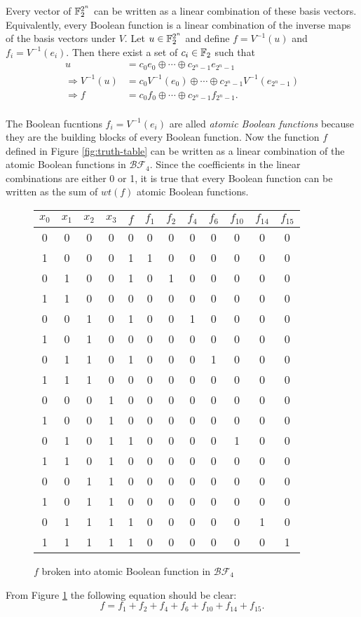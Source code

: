 \par Every vector of $\mathbb{F}_2^{2^n}$ can be written as a linear combination of these
basis vectors. Equivalently, every Boolean function is a linear combination of the
inverse maps of the basis vectors under $V$. Let $u\in\mathbb{F}_2^{2^n}$ and define
$f=V^{-1}(u)$ and $f_i=V^{-1}(e_i)$. Then there exist a set of $c_i\in\mathbb{F}_2$ such that
\begin{align*}
						  u        &=c_0e_0\oplus\cdots\oplus c_{2^n-1}e_{2^n-1} \\
	\Rightarrow V^{-1}(u)&=c_0V^{-1}(e_0)\oplus\cdots\oplus c_{2^n-1}V^{-1}(e_{2^n-1}) \\
	\Rightarrow f        &=c_0f_0\oplus\cdots\oplus c_{2^n-1}f_{2^n-1}.\\
\end{align*}

\par The Boolean fucntions $f_i=V^{-1}(e_i)$ are alled {\em atomic Boolean functions}
because they are the building blocks of every Boolean function. Now the function
$f$ defined in Figure \ref{fig:truth-table} can be written as a linear combination
of the atomic Boolean functions in $\mathcal{BF}_4$. Since the coefficients in the
linear combinations are either 0 or 1, it is true that every Boolean function can be
written as the sum of $wt(f)$ atomic Boolean functions.
\begin{figure}[h!]\label{fig:atomic-f}
	\centering
  \begin{tabular}{|c|c|c|c|c|c|c|c|c|c|c|c|}
    \hline
    $x_0$&$x_1$&$x_2$&$x_3$&$f$&$f_1$&$f_2$&$f_4$&$f_6$&$f_{10}$&$f_{14}$&$f_{15}$\\
    \hline
    0&0&0&0&0&0&0&0&0&0&0&0\\
    1&0&0&0&1&1&0&0&0&0&0&0\\
    0&1&0&0&1&0&1&0&0&0&0&0\\
    1&1&0&0&0&0&0&0&0&0&0&0\\
    0&0&1&0&1&0&0&1&0&0&0&0\\
    1&0&1&0&0&0&0&0&0&0&0&0\\
    0&1&1&0&1&0&0&0&1&0&0&0\\
    1&1&1&0&0&0&0&0&0&0&0&0\\
    0&0&0&1&0&0&0&0&0&0&0&0\\
    1&0&0&1&0&0&0&0&0&0&0&0\\
    0&1&0&1&1&0&0&0&0&1&0&0\\
    1&1&0&1&0&0&0&0&0&0&0&0\\
    0&0&1&1&0&0&0&0&0&0&0&0\\
    1&0&1&1&0&0&0&0&0&0&0&0\\
    0&1&1&1&1&0&0&0&0&0&1&0\\
    1&1&1&1&1&0&0&0&0&0&0&1\\
  	\hline
	\end{tabular}
	\caption{$f$ broken into atomic Boolean function in $\mathcal{BF}_4$}
\end{figure}
\par From Figure \ref{fig:atomic-f} the following equation should be clear:
\[
f=f_1+f_2+f_4+f_6+f_{10}+f_{14}+f_{15}.
\]

